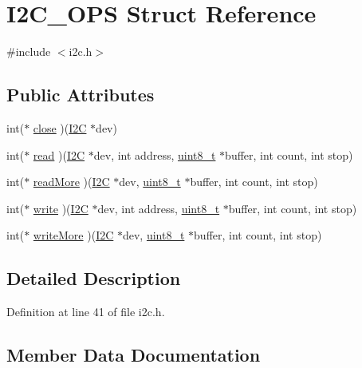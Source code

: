 \hypertarget{structI2C__OPS}{}\section{I2\+C\+\_\+\+O\+PS Struct Reference}
\label{structI2C__OPS}


{\ttfamily \#include $<$i2c.\+h$>$}

\subsection*{Public Attributes}
\begin{DoxyCompactItemize}
\item 
int($\ast$ \mbox{\hyperlink{structI2C__OPS_ac7ef347101ff035c6767ea9fb7250bd8}{close}} )(\mbox{\hyperlink{structI2C}{I2C}} $\ast$dev)
\item 
int($\ast$ \mbox{\hyperlink{structI2C__OPS_a2ff14bf2b2b01d2c4f5b4e802322dc57}{read}} )(\mbox{\hyperlink{structI2C}{I2C}} $\ast$dev, int address, \mbox{\hyperlink{stdint_8h_aba7bc1797add20fe3efdf37ced1182c5}{uint8\+\_\+t}} $\ast$buffer, int count, int stop)
\item 
int($\ast$ \mbox{\hyperlink{structI2C__OPS_a6ce358dfa4de1e4ee92ad5ba68c1e7b9}{read\+More}} )(\mbox{\hyperlink{structI2C}{I2C}} $\ast$dev, \mbox{\hyperlink{stdint_8h_aba7bc1797add20fe3efdf37ced1182c5}{uint8\+\_\+t}} $\ast$buffer, int count, int stop)
\item 
int($\ast$ \mbox{\hyperlink{structI2C__OPS_a930089cdac6e57badc81887655a5d53d}{write}} )(\mbox{\hyperlink{structI2C}{I2C}} $\ast$dev, int address, \mbox{\hyperlink{stdint_8h_aba7bc1797add20fe3efdf37ced1182c5}{uint8\+\_\+t}} $\ast$buffer, int count, int stop)
\item 
int($\ast$ \mbox{\hyperlink{structI2C__OPS_a582c8913180598f905a1053c0e307e20}{write\+More}} )(\mbox{\hyperlink{structI2C}{I2C}} $\ast$dev, \mbox{\hyperlink{stdint_8h_aba7bc1797add20fe3efdf37ced1182c5}{uint8\+\_\+t}} $\ast$buffer, int count, int stop)
\end{DoxyCompactItemize}


\subsection{Detailed Description}


Definition at line 41 of file i2c.\+h.



\subsection{Member Data Documentation}
\mbox{\label{structI2C__OPS_ac7ef347101ff035c6767ea9fb7250bd8}} 
